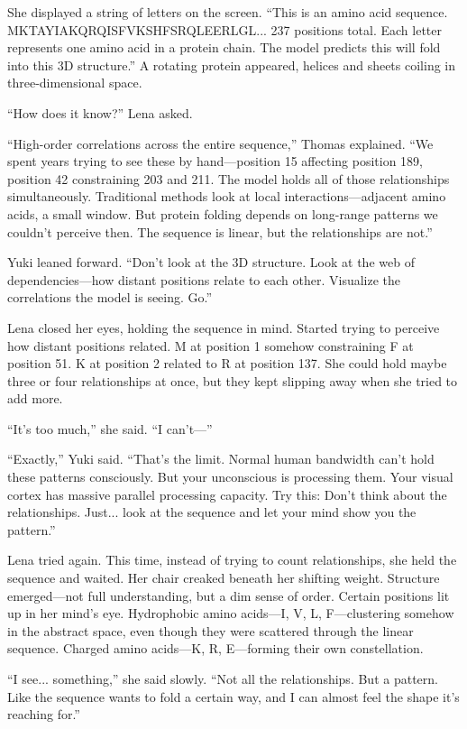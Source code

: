She displayed a string of letters on the screen. ``This is an amino acid sequence. MKTAYIAKQRQISFVKSHFSRQLEERLGL... 237 positions total. Each letter represents one amino acid in a protein chain. The model predicts this will fold into this 3D structure.'' A rotating protein appeared, helices and sheets coiling in three-dimensional space.

``How does it know?'' Lena asked.

``High-order correlations across the entire sequence,'' Thomas explained. ``We spent years trying to see these by hand—position 15 affecting position 189, position 42 constraining 203 and 211. The model holds all of those relationships simultaneously. Traditional methods look at local interactions—adjacent amino acids, a small window. But protein folding depends on long-range patterns we couldn't perceive then. The sequence is linear, but the relationships are not.''

Yuki leaned forward. ``Don't look at the 3D structure. Look at the web of dependencies—how distant positions relate to each other. Visualize the correlations the model is seeing. Go.''

Lena closed her eyes, holding the sequence in mind. Started trying to perceive how distant positions related. M at position 1 somehow constraining F at position 51. K at position 2 related to R at position 137. She could hold maybe three or four relationships at once, but they kept slipping away when she tried to add more.

``It's too much,'' she said. ``I can't—''

``Exactly,'' Yuki said. ``That's the limit. Normal human bandwidth can't hold these patterns consciously. But your unconscious is processing them. Your visual cortex has massive parallel processing capacity. Try this: Don't think about the relationships. Just... look at the sequence and let your mind show you the pattern.''

Lena tried again. This time, instead of trying to count relationships, she held the sequence and waited. Her chair creaked beneath her shifting weight. Structure emerged—not full understanding, but a dim sense of order. Certain positions lit up in her mind's eye. Hydrophobic amino acids—I, V, L, F—clustering somehow in the abstract space, even though they were scattered through the linear sequence. Charged amino acids—K, R, E—forming their own constellation.

``I see... something,'' she said slowly. ``Not all the relationships. But a pattern. Like the sequence wants to fold a certain way, and I can almost feel the shape it's reaching for.''

